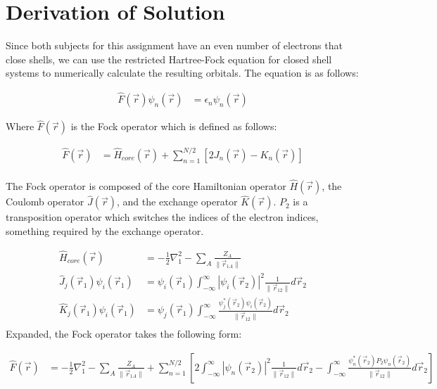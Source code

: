 \documentclass[10pt, oneside, letterpaper]{article}
\begin{document}
\section{Derivation of Solution}

Since both subjects for this assignment have an even number of electrons that close shells, we can use the restricted Hartree-Fock equation for closed shell systems to numerically calculate the resulting orbitals. The equation is as follows:

\begin{align*}
  \hat{F}(\vec{r})\psi_n(\vec{r}) &= \epsilon_n\psi_n(\vec{r})
\end{align*}

Where $\hat{F}(\vec{r})$ is the Fock operator which is defined as follows:

\begin{align*}
  \hat{F}(\vec{r}) &= \hat{H}_{core}(\vec{r}) + \sum_{n=1}^{N/2}\left[2J_n(\vec{r}) - K_n(\vec{r})\right]\\
\end{align*}

The Fock operator is composed of the core Hamiltonian operator $\hat{H}(\vec{r})$, the Coulomb operator $\hat{J}(\vec{r})$, and the exchange operator $\hat{K}(\vec{r})$. $P_2$ is a transposition operator which switches the indices of the electron indices, something required by the exchange operator.

\begin{align*}
  \hat{H}_{core}(\vec{r}) &= -\frac{1}{2}\nabla_1^2 - \sum_A\frac{Z_A}{\|\vec{r}_{1 A}\|}\\
  \hat{J}_j(\vec{r}_1)\psi_i(\vec{r}_1) &= \psi_i(\vec{r}_1)\int_{-\infty}^{\infty}\left|\psi_i(\vec{r}_2)\right|^2\frac{1}{\|\vec{r}_{12}\|}d\vec{r}_2 \\
  \hat{K}_j(\vec{r}_1)\psi_i(\vec{r}_1) &= \psi_j(\vec{r}_1)\int_{-\infty}^{\infty}\frac{\psi_j^\ast(\vec{r}_2)\psi_i(\vec{r}_2)}{\|\vec{r}_{12}\|}d\vec{r}_2 \\
\end{align*}
Expanded, the Fock operator takes the following form:

\begin{align*}
  \hat{F}(\vec{r}) &= -\frac{1}{2}\nabla_1^2 - \sum_A\frac{Z_A}{\|\vec{r}_{1 A}\|} + \sum_{n=1}^{N/2}\left[2\int_{-\infty}^{\infty}\left|\psi_n(\vec{r}_2)\right|^2\frac{1}{\|\vec{r}_{12}\|}d\vec{r}_2 - \int_{-\infty}^{\infty}\frac{\psi_n^\ast(\vec{r}_2)P_2\psi_n(\vec{r}_2)}{\|\vec{r}_{12}\|}d\vec{r}_2\right]
\end{align*}
\end{document}
